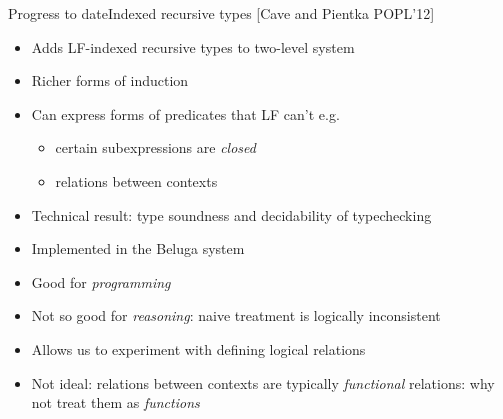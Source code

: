 \documentclass[usenames,dvipsnames]{beamer}
\begin{document}

\begin{frame}{Progress to date}{Indexed recursive types [Cave and Pientka POPL'12]}
\begin{itemize}
\item Adds LF-indexed recursive types to two-level system
\item Richer forms of induction
\item Can express forms of predicates that LF can't e.g.
\begin{itemize}
\item certain subexpressions are \emph{closed}
\item relations between contexts
\end{itemize}
\item Technical result: type soundness and decidability of typechecking
\item Implemented in the Beluga system
\item Good for \emph{programming}
\item Not so good for \emph{reasoning}: naive treatment is logically inconsistent
\item Allows us to experiment with defining logical relations
\item Not ideal: relations between contexts are typically \emph{functional} relations: why not treat them as \emph{functions}
\end{itemize}
\end{frame}
\end{document}
